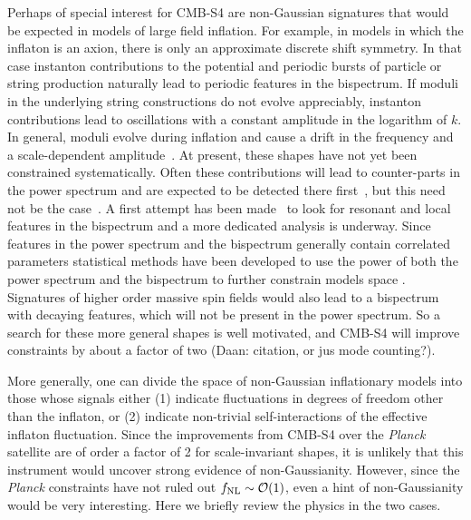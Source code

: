 Perhaps of special interest for CMB-S4 are non-Gaussian signatures that would be expected in models of large field inflation. For example, in models in which the inflaton is an axion, there is only an approximate discrete shift symmetry. In that case instanton contributions to the potential and periodic bursts of particle or string production naturally lead to periodic features in the bispectrum. If moduli in the underlying string constructions do not evolve appreciably, instanton contributions lead to oscillations with a constant amplitude in the logarithm of $k$. In general, moduli evolve during inflation and cause a drift in the frequency and a scale-dependent amplitude~\cite{Flauger:2014ana}. At present, these shapes have not yet been constrained systematically. Often these contributions will lead to counter-parts in the power spectrum and are expected to be detected there first~\cite{Behbahani:2011it}, but this need not be the case~\cite{Behbahani:2012be}. A first attempt has been made~\cite{Ade:2015ava} to look for resonant and local features in the bispectrum and a more dedicated analysis is underway. Since features in the power spectrum and the bispectrum generally contain correlated parameters \cite{Achucarro:2010da,NonBDBispectrum2009,nonBDbispectrum2015,Flauger:2010ja} statistical methods have been developed to use the power of both the power spectrum and the bispectrum to further constrain models space \cite{Meerburg2015b,Moritz2016,Fergusson:2014hya}. Signatures of higher order massive spin fields \cite{Arkani-Hamed:2015bza,Chen:2015lza} would also lead to a bispectrum with decaying features, which will not be present in the power spectrum.  So a search for these more general shapes is well motivated, and CMB-S4 will improve constraints by about a factor of two (Daan: citation, or jus mode counting?). 

More generally, one can divide the space of non-Gaussian inflationary models into those whose signals either (1) indicate fluctuations in degrees of freedom other than the inflaton, or (2) indicate non-trivial self-interactions of the effective inflaton fluctuation. Since the improvements from CMB-S4 over the {\it Planck} satellite are of order a factor of 2 for scale-invariant shapes, it is unlikely that this instrument would uncover strong evidence of non-Gaussianity. However, since the {\it Planck} constraints have not ruled out $f_{\rm NL}\sim\mathcal{O}(1)$, even a hint of non-Gaussianity would be very interesting. Here we briefly review the physics in the two cases.

